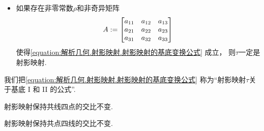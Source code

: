\begin{theorem}
\begin{itemize}
	\item
	如果存在非零常数\(\rho\)和非奇异矩阵\begin{equation*}
		A
		:=
		\begin{bmatrix}
			a_{11} & a_{12} & a_{13} \\
			a_{21} & a_{22} & a_{23} \\
			a_{31} & a_{32} & a_{33}
		\end{bmatrix}
	\end{equation*}
	使得\cref{equation:解析几何.射影映射.射影映射的基底变换公式} 成立，
	则\(\tau\)一定是射影映射.
\end{itemize}
\end{theorem}

我们把\cref{equation:解析几何.射影映射.射影映射的基底变换公式}
称为“射影映射\(\tau\)关于基底 I 和 II 的公式”.

\begin{property}
射影映射保持共线四点的交比不变.
\end{property}

\begin{property}
射影映射保持共点四线的交比不变.
\end{property}
